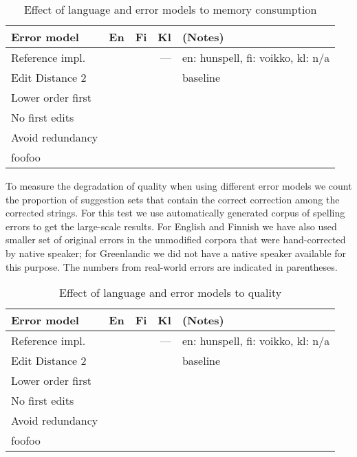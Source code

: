 \documentclass[11pt]{article}
\begin{document}
\begin{table}[h]
\begin{center}
\begin{scriptsize}
\begin{tabular}{|l|rrrl|}
\hline
\bf Error model & \bf En & \bf Fi & \bf Kl & (Notes) \\ 
\hline
Reference impl.   & & & --- & en: hunspell, fi: voikko, kl: n/a \\
\hline
Edit Distance 2   & & & & baseline \\
Lower order first & & & & \\
No first edits    & & & & \\
Avoid redundancy  & & & & \\
foofoo            & & & & \\
\hline
\end{tabular}
\end{scriptsize}
\end{center}
\caption{\label{table:error-model-vs-language-memory} Effect of language and 
error models to memory consumption}
\end{table}

To measure the degradation of quality when using different error models we
count the proportion of suggestion sets that contain the correct correction
among the corrected strings. For this test we use automatically generated corpus
of spelling errors to get the large-scale results. For English and Finnish we
have also used smaller set of original errors in the unmodified corpora that
were hand-corrected by native speaker; for Greenlandic we did not have a native
speaker available for this purpose. The numbers from real-world errors are 
indicated in parentheses.

\begin{table}[h]
\begin{center}
\begin{scriptsize}
\begin{tabular}{|l|rrrl|}
\hline
\bf Error model & \bf En & \bf Fi & \bf Kl & (Notes) \\ 
\hline
Reference impl.   & & & --- & en: hunspell, fi: voikko, kl: n/a \\
\hline
Edit Distance 2   & & & & baseline \\
Lower order first & & & & \\
No first edits    & & & & \\
Avoid redundancy  & & & & \\
foofoo            & & & & \\
\hline
\end{tabular}
\end{scriptsize}
\end{center}
\caption{\label{table:error-model-vs-language} Effect of language and 
error models to quality}
\end{table}
\end{document}
